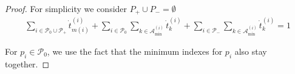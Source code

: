 \documentclass{article}
\begin{document}
\begin{proof}

 For simplicity we consider $P_+\cup P_-=\emptyset$
    \begin{align}
        \sum_{i\in\mathcal{P}_{0}\cup\mathcal{P}_{+}} \dot{t}^{(i)}_{m(i)}  + \sum_{i\in\mathcal{P}_{0}} \sum_{k\in\mathcal{A}^{(i)}_{\min}}\dot{t}^{(i)}_k +\sum_{i\in \mathcal{P}_{-}}\sum_{k\in\mathcal{A}^{(i)}_{\min}}\dot{t}^{(i)}_k   = 1 \label{eq:sumalltitwo}
    \end{align}

       
 For $p_i\in \mathcal{P}_{0}$, we use the fact that the minimum indexes for $p_i$ also stay together. 
        

\end{proof}
\end{document}
